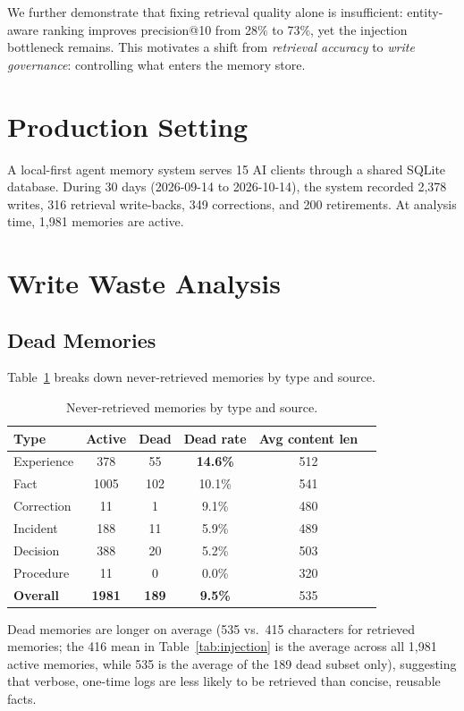 \documentclass[11pt]{article}
\begin{document}
We further demonstrate that fixing retrieval quality alone is insufficient: entity-aware ranking improves precision@10 from 28\% to 73\%, yet the injection bottleneck remains. This motivates a shift from \emph{retrieval accuracy} to \emph{write governance}: controlling what enters the memory store.

\section{Production Setting}

A local-first agent memory system serves 15 AI clients through a shared SQLite database. During 30 days (2026-09-14 to 2026-10-14), the system recorded 2,378 writes, 316 retrieval write-backs, 349 corrections, and 200 retirements. At analysis time, 1,981 memories are active.

\section{Write Waste Analysis}

\subsection{Dead Memories}

Table~\ref{tab:dead} breaks down never-retrieved memories by type and source.

\begin{table}[h]
\centering
\caption{Never-retrieved memories by type and source.}
\label{tab:dead}
\begin{tabular}{lccccc}
\toprule
Type & Active & Dead & Dead rate & Avg content len \\
\midrule
Experience & 378 & 55 & \textbf{14.6\%} & 512 \\
Fact & 1005 & 102 & 10.1\% & 541 \\
Correction & 11 & 1 & 9.1\% & 480 \\
Incident & 188 & 11 & 5.9\% & 489 \\
Decision & 388 & 20 & 5.2\% & 503 \\
Procedure & 11 & 0 & 0.0\% & 320 \\
\midrule
\textbf{Overall} & \textbf{1981} & \textbf{189} & \textbf{9.5\%} & 535 \\
\bottomrule
\end{tabular}
\end{table}

Dead memories are longer on average (535 vs.\ 415 characters for retrieved memories; the 416 mean in Table~\ref{tab:injection} is the average across all 1,981 active memories, while 535 is the average of the 189 dead subset only), suggesting that verbose, one-time logs are less likely to be retrieved than concise, reusable facts.
\end{document}
